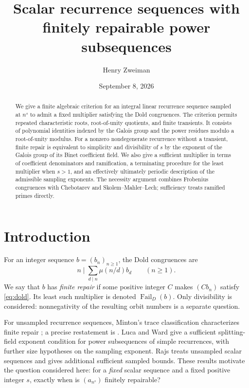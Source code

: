 \documentclass[11pt]{article}
\title{Scalar recurrence sequences with finitely repairable power subsequences}
\author{Henry Zweiman}
\date{September 8, 2026}
\theoremstyle{definition}
\theoremstyle{remark}
\newcommand{\Fail}{\operatorname{Fail}_{D}}
\begin{document}
\maketitle
\begin{abstract}
We give a finite algebraic criterion for an integral linear recurrence sequence sampled at $n^s$ to admit a fixed multiplier satisfying the Dold congruences. The criterion permits repeated characteristic roots, root-of-unity quotients, and finite transients. It consists of polynomial identities indexed by the Galois group and the power residues modulo a root-of-unity modulus. For a nonzero nondegenerate recurrence without a transient, finite repair is equivalent to simplicity and divisibility of $s$ by the exponent of the Galois group of its Binet coefficient field. We also give a sufficient multiplier in terms of coefficient denominators and ramification, a terminating procedure for the least multiplier when $s>1$, and an effectively ultimately periodic description of the admissible sampling exponents. The necessity argument combines Frobenius congruences with Chebotarev and Skolem--Mahler--Lech; sufficiency treats ramified primes directly.
\end{abstract}

\section{Introduction}
For an integer sequence $b=(b_n)_{n\geq1}$, the Dold congruences are
\begin{equation}\label{eq:dold}
 n\mid\sum_{d\mid n}\mu(n/d)b_d\qquad(n\geq1).
\end{equation}
We say that $b$ has \emph{finite repair} if some positive integer $C$ makes $(Cb_n)$ satisfy \eqref{eq:dold}. Its least such multiplier is denoted $\Fail(b)$. Only divisibility is considered: nonnegativity of the resulting orbit numbers is a separate question.

For unsampled recurrence sequences, Minton's trace classification characterizes finite repair \cite{Minton}; a precise restatement is \cite[Theorem~2.4]{BGW}. Luca and Ward \cite[Theorem~1]{LW} give a sufficient splitting-field exponent condition for power subsequences of simple recurrences, with further size hypotheses on the sampling exponent. Rajs \cite[Theorems~8 and~9]{Rajs} treats unsampled scalar sequences and gives additional sufficient sampled bounds. These results motivate the question considered here: for a \emph{fixed} scalar sequence and a fixed positive integer $s$, exactly when is $(a_{n^s})$ finitely repairable?
\end{document}
